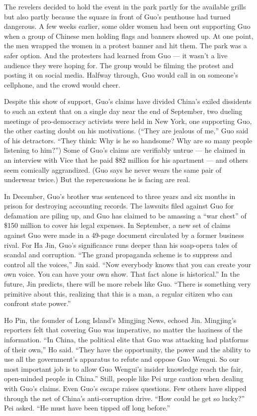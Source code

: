 The revelers decided to hold the event in the park partly for the
available grills but also partly because the square in front of Guo's
penthouse had turned dangerous. A few weeks earlier, some older women
had been out supporting Guo when a group of Chinese men holding flags
and banners showed up. At one point, the men wrapped the women in a
protest banner and hit them. The park was a safer option. And the
protesters had learned from Guo --- it wasn't a live audience they were
hoping for. The group would be filming the protest and posting it on
social media. Halfway through, Guo would call in on someone's cellphone,
and the crowd would cheer.

Despite this show of support, Guo's claims have divided China's exiled
dissidents to such an extent that on a single day near the end of
September, two dueling meetings of pro-democracy activists were held in
New York, one supporting Guo, the other casting doubt on his
motivations. (``They are jealous of me,'' Guo said of his detractors.
``They think: Why is he so handsome? Why are so many people listening to
him?'') Some of Guo's claims are verifiably untrue --- he claimed in an
interview with Vice that he paid \$82 million for his apartment --- and
others seem comically aggrandized. (Guo says he never wears the same
pair of underwear twice.) But the repercussions he is facing are real.

In December, Guo's brother was sentenced to three years and six months
in prison for destroying accounting records. The lawsuits filed against
Guo for defamation are piling up, and Guo has claimed to be amassing a
``war chest'' of \$150 million to cover his legal expenses. In
September, a new set of claims against Guo were made in a 49-page
document circulated by a former business rival. For Ha Jin, Guo's
significance runs deeper than his soap-opera tales of scandal and
corruption. ``The grand propaganda scheme is to suppress and control all
the voices,'' Jin said. ``Now everybody knows that you can create your
own voice. You can have your own show. That fact alone is historical.''
In the future, Jin predicts, there will be more rebels like Guo. ``There
is something very primitive about this, realizing that this is a man, a
regular citizen who can confront state power.''

Ho Pin, the founder of Long Island's Mingjing News, echoed Jin.
Mingjing's reporters felt that covering Guo was imperative, no matter
the haziness of the information. ``In China, the political elite that
Guo was attacking had platforms of their own,'' Ho said. ``They have the
opportunity, the power and the ability to use all the government's
apparatus to refute and oppose Guo Wengui. So our most important job is
to allow Guo Wengui's insider knowledge reach the fair, open-minded
people in China.'' Still, people like Pei urge caution when dealing with
Guo's claims. Even Guo's escape raises questions. Few others have
slipped through the net of China's anti-corruption drive. ``How could he
get so lucky?'' Pei asked. ``He must have been tipped off long before.''

